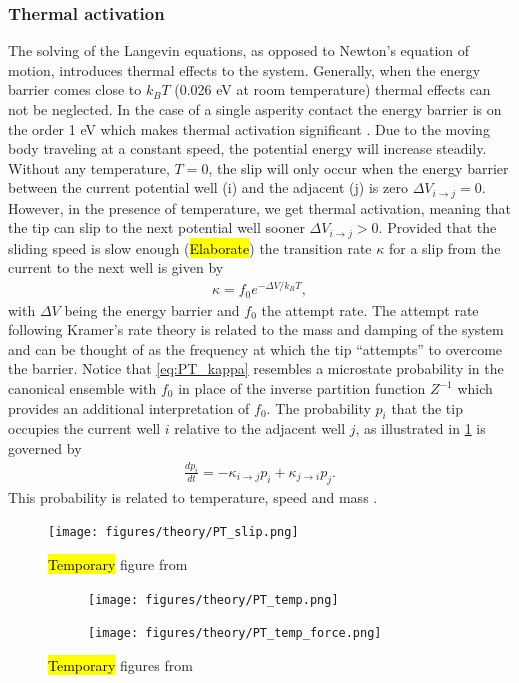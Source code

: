 \subsubsection{Thermal activation}
The solving of the Langevin equations, as opposed to Newton's equation of motion, introduces thermal effects to the system. Generally, when the energy barrier comes close to $k_B T$ (0.026 eV at room temperature) thermal effects can not be neglected. In the case of a single asperity contact the energy barrier is on the order 1 eV which makes thermal activation significant \cite{Yalin_2011}. Due to the moving body traveling at a constant speed, the potential energy will increase steadily. Without any temperature, $T = 0$, the slip will only occur when the energy barrier between the current potential well (i) and the adjacent (j) is zero $\Delta V_{i\to j} = 0$. However, in the presence of temperature, we get thermal activation, meaning that the tip can slip to the next potential well sooner $\Delta V_{i\to j} > 0$. Provided that the sliding speed is slow enough (\hl{Elaborate}) the transition rate $\kappa$ for a slip from the current to the next well is given by
\begin{align}
  \kappa = f_0 e^{-\Delta V / k_B T},
  \label{eq:PT_kappa}
\end{align}
with $\Delta V$ being the energy barrier and $f_0$ the attempt rate. The attempt rate following Kramer’s rate theory \cite{RevModPhys.62.251} is related to the mass and damping of the system and can be thought of as the frequency at which the tip ``attempts'' to overcome the barrier. Notice that \cref{eq:PT_kappa} resembles a microstate probability in the canonical ensemble with $f_0$ in place of the inverse partition function $Z^{-1}$ which provides an additional interpretation of $f_0$. The probability $p_i$ that the tip occupies the current well $i$ relative to the adjacent well $j$, as illustrated in \cref{fig:PT_slip} is governed by 
\begin{align*}
  \frac{dp_i}{dt} = -\kappa_{i\to j}p_i + \kappa_{j\to i}p_j.
\end{align*}
This probability is related to temperature, speed and mass \cite{Yalin_2011}.

\begin{figure}[H]
  \centering
  \texttt{[image: figures/theory/PT\_slip.png]}
  \caption{\hl{Temporary} figure from \cite{Yalin_2011}}
  \label{fig:PT_slip}
\end{figure}


\begin{figure}[H]
  \centering
  \begin{subfigure}[t]{0.49\textwidth}
      \centering
      \texttt{[image: figures/theory/PT\_temp.png]}
      \caption{}
      \label{fig:PT_temp_a}
  \end{subfigure}
  \hfill
  \begin{subfigure}[t]{0.49\textwidth}
      \centering
      \texttt{[image: figures/theory/PT\_temp\_force.png]}
      \caption{}
      \label{fig:PT_temp_b}
  \end{subfigure}
  \hfill
  \hfill
     \caption{\hl{Temporary} figures from \cite{Yalin_2011}}
     \label{fig:PT_temp}
\end{figure}

